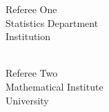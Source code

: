 \documentclass{wgu-cv}
\begin{document}
\begin{multicols}{2}

\begin{minipage}{\linewidth}
  Referee One \\
  Statistics Department \\
  Institution \\
   \\
\end{minipage}

\begin{minipage}{\linewidth}
  Referee Two \\
  Mathematical Institute \\
  University \\
   \\
\end{minipage}


\end{multicols}


\end{document}
